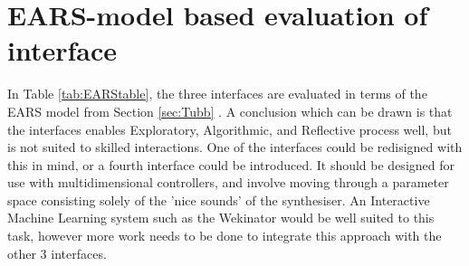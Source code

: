 \documentclass[11pt, oneside]{report}   	%
\begin{document}
\section{EARS-model based evaluation of interface}\label{sec:EARS}
In Table \ref{tab:EARStable}, the three interfaces are evaluated in terms of the EARS model from Section \ref{sec:Tubb} \cite{TubbThesis}.
A conclusion which can be drawn is that the interfaces enables Exploratory, Algorithmic, and Reflective process well, but is not suited to skilled interactions. One of the interfaces could be redisigned with this in mind, or a fourth interface could be introduced.  It should be designed for use with multidimensional controllers, and involve moving through a parameter space consisting solely of the 'nice sounds' of the synthesiser. An Interactive Machine Learning system such as the Wekinator \cite{Wekinator} would be well suited to this task, however more work needs to be done to integrate this approach with the other 3 interfaces.
\end{document}
